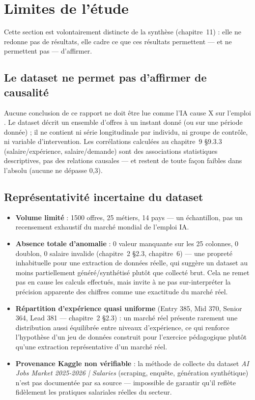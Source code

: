 \chapter{Limites de l'étude}

Cette section est volontairement distincte de la synthèse
(chapitre~11) : elle ne redonne pas de résultats, elle cadre ce que ces
résultats permettent — et ne permettent pas — d'affirmer.

\section{Le dataset ne permet pas d'affirmer de causalité}

Aucune conclusion de ce rapport ne doit être lue comme \og l'IA cause
X sur l'emploi \fg{}. Le dataset décrit un ensemble d'offres à un
instant donné (ou sur une période donnée) ; il ne contient ni série
longitudinale par individu, ni groupe de contrôle, ni variable
d'intervention. Les corrélations calculées au chapitre~9 §9.3.3
(salaire/expérience, salaire/demande) sont des associations
statistiques descriptives, pas des relations causales — et restent de
toute façon faibles dans l'absolu (aucune ne dépasse 0,3).

\section{Représentativité incertaine du dataset}

\begin{itemize}[leftmargin=1.5em]
  \item \textbf{Volume limité} : 1500 offres, 25 métiers, 14 pays — un
    échantillon, pas un recensement exhaustif du marché mondial de
    l'emploi IA.
  \item \textbf{Absence totale d'anomalie} : 0 valeur manquante sur les
    25 colonnes, 0 doublon, 0 salaire invalide (chapitre~2 §2.3,
    chapitre~6) — une propreté inhabituelle pour une extraction de
    données réelle, qui suggère un dataset au moins partiellement
    généré/synthétisé plutôt que collecté brut. Cela ne remet pas en
    cause les calculs effectués, mais invite à ne pas sur-interpréter
    la précision apparente des chiffres comme une exactitude du marché
    réel.
  \item \textbf{Répartition d'expérience quasi uniforme} (Entry 385,
    Mid 370, Senior 364, Lead 381 — chapitre~2 §2.3) : un marché réel
    présente rarement une distribution aussi équilibrée entre niveaux
    d'expérience, ce qui renforce l'hypothèse d'un jeu de données
    construit pour l'exercice pédagogique plutôt qu'une extraction
    représentative d'un marché réel.
  \item \textbf{Provenance Kaggle non vérifiable} : la méthode de
    collecte du dataset \emph{AI Jobs Market 2025-2026 | Salaries}
    (scraping, enquête, génération synthétique) n'est pas documentée
    par sa source — impossible de garantir qu'il reflète fidèlement les
    pratiques salariales réelles du secteur.
\end{itemize}

